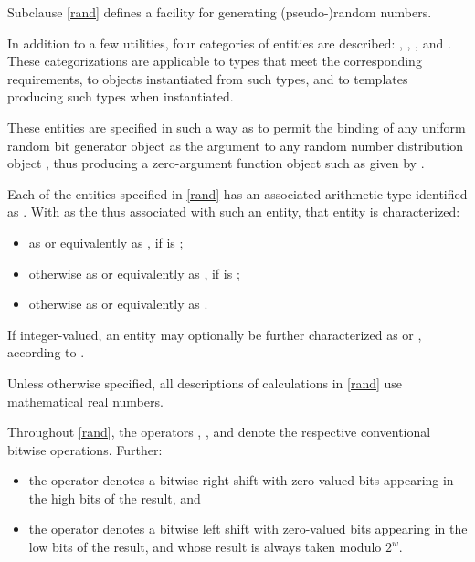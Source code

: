 \pnum
Subclause \ref{rand} defines a facility
for generating (pseudo-)random numbers.

\pnum
In addition to a few utilities,
four categories of entities are described:
,
,
,
and
.
These categorizations are applicable
to types that meet the corresponding requirements,
to objects instantiated from such types,
and to templates producing such types when instantiated.
\begin{note}
 These entities are specified in such a way
 as to permit the binding
 of any uniform random bit generator object 
 as the argument
 to any random number distribution object ,
 thus producing a zero-argument function object
 such as given by
 .
\end{note}

\pnum
Each of the entities specified in \ref{rand}
has an associated arithmetic type
identified as .
With  as the 
thus associated with such an entity,
that entity is characterized:
\begin{itemize}
 \item
   as  or equivalently as ,
   if  is ;
 \item
   otherwise
   as  or equivalently as ,
   if  is ;
 \item
   otherwise
   as  or equivalently as .
\end{itemize}
\noindent
If integer-valued,
an entity may optionally be further characterized as
 or ,
according to .

\pnum
Unless otherwise specified,
all descriptions of calculations
in \ref{rand}
use mathematical real numbers.

\pnum
Throughout \ref{rand},
the operators
\bitand, \bitor, and \xor{}
denote the respective conventional bitwise operations.
Further:
\begin{itemize}
 \item
   the operator \rightshift{} denotes a bitwise right shift
   with zero-valued bits appearing in the high bits of the result, and
 \item
   the operator  denotes a bitwise left shift
   with zero-valued bits appearing in the low bits of the result,
   and whose result is always taken modulo $2^w$.
\end{itemize}


